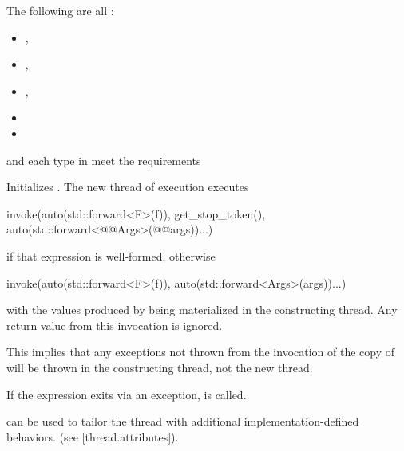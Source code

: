 \documentclass{wg21}
\begin{document}
\begin{itemdescr}
\pnum
\mandates
The following are all :
\begin{itemize}
\item {},
\item {},
\item {},
\item {}
\item {}
\end{itemize}

\pnum
\expects
{} and each type in  meet the
 requirements

\pnum
\effects
Initializes .
The new thread of execution executes
\begin{codeblock}
invoke(auto(std::forward<F>(f)), get_stop_token(),
       auto(std::forward<@@Args>(@@args))...)
\end{codeblock}
if that expression is well-formed,
otherwise
\begin{codeblock}
invoke(auto(std::forward<F>(f)), auto(std::forward<Args>(args))...)
\end{codeblock}
with the values produced by 
being materialized in the constructing thread.
Any return value from this invocation is ignored.
\begin{note}
This implies that any exceptions not thrown from the invocation of the copy
of  will be thrown in the constructing thread, not the new thread.
\end{note}
If the  expression exits via an exception,
 is called.

\begin{addedblock}
 can be used to tailor the thread with additional implementation-defined behaviors. (see [thread.attributes]).
\end{addedblock}


\end{itemdescr}
\end{document}
